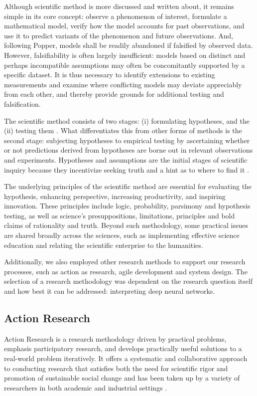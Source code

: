 Although scientific method \cite{2016397} is more discussed and written about, it remains simple in its core concept: observe a phenomenon of interest, formulate a mathematical model, verify how the model accounts for past observations, and use it to predict variants of the phenomenon and future observations. And, following Popper, models shall be readily abandoned if falsified by observed data. However, falsifiability is often largely insufficient: models based on distinct and perhaps incompatible assumptions may often be concomitantly supported by a specific dataset. It is thus necessary to identify extensions to existing measurements and examine where conflicting models may deviate appreciably from each other, and thereby provide grounds for additional testing and falsification.

The scientific method consists of two stages: (i) formulating hypotheses, and the (ii) testing them \cite{2016397}. What differentiates this from other forms of methods is the second stage: subjecting hypotheses to empirical testing by ascertaining whether or not predictions derived from hypotheses are borne out in relevant observations and experiments. Hypotheses and assumptions are the initial stages of scientific inquiry because they incentivize seeking truth and a hint as to where to find it \cite{AYALA2016xi}.

The underlying principles of the scientific method \cite{gauch_jr_2012} are essential for evaluating the hypothesis, enhancing perspective, increasing productivity, and inspiring innovation. These principles include logic, probability, parsimony and hypothesis testing, as well as science's presuppositions, limitations, principles and bold claims of rationality and truth. Beyond such methodology, some practical issues are shared broadly across the sciences, such as implementing effective science education and relating the scientific enterprise to the humanities.

Additionally, we also employed other research methods to support our research processes, such as action as research, agile development and system design. The selection of a research methodology was dependent on the research question itself and how best it can be addressed: interpreting deep neural networks.

\subsection{Action Research}
Action Research is a research methodology driven by practical problems, emphasis participatory research, and develops practically useful solutions to a real-world problem iteratively. It offers a systematic and collaborative approach to conducting research that satisfies both the need for scientific rigor and promotion of sustainable social change and has been taken up by a variety of researchers in both academic and industrial settings \cite{Hayes:2011:RAR:1993060.1993065}.

